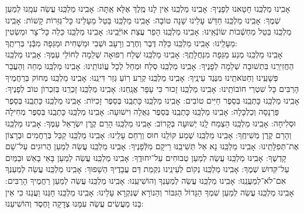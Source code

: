 \documentclass[twoside, openany, parskip=half, 11pt]{book}
\begin{document}
{ אָבִֽינוּ מַלְכֵּֽנוּ  חָטָאנוּ לְפָנֶיךָ:\hfill \break
אָבִֽינוּ מַלְכֵּֽנוּ אֵין לָנוּ מֶֽלֶךְ אֶלָּא אַֽתָּה: \hfill \break
 אָבִֽינוּ מַלְכֵּֽנוּ עֲשֵׂה עִמָֽנוּ לְמַעַן שְׁמֶךָ:\hfill \break
 אָבִֽינוּ מַלְכֵּֽנוּ חַדֵּשׁ עָלֵינוּ שָׁנָה טוֹבָה:\hfill \break
 אָבִֽינוּ מַלְכֵּֽנוּ בַּטֵל מֵעָלֵינוּ כָּל־גְּזֵּרוֹת קָשׁוֹת:\hfill \break
 אָבִֽינוּ מַלְכֵּֽנוּ בַּטֵל מַחְשְֿׁבוֹת שׂוֹנְֿאֵֽינוּ:\hfill \break
 אָבִֽינוּ מַלְכֵּֽנוּ הָפֵר עֲצַת אוֹיְּֿבֵֽינוּ:\hfill \break
 אָבִֽינוּ מַלְכֵּֽנוּ כַּלֵה כָּל־צָר וּמַשְׂטִין מֵעָלֵֽינוּ:\hfill \break
 אָבִֽינוּ מַלְכֵּֽנוּ כַּלֵּה דֶּבֶר וְחֶרֶב וְרָעָב וּשְׁבִי וּמַשְׁחִית וּמַגֵּפָה  מִבְּֿנֵי בְּרִיתֶֽךָ:\\
 אָבִֽינוּ מַלְכֵּֽנוּ מְנַע מַגֵּפָה מִנַּחֲלָתֶֽךָ:\hfill \break
 אָבִֽינוּ מַלְכֵּֽנוּ שְׁלַח רְפוּאָה שְׁלֵמָה לְחוֹלֵי עַמֶּךָ:\hfill \break
 אָבִֽינוּ מַלְכֵּֽנוּ הַחֲזִירֵֽנוּ בִּתְשׁוּבָה שְׁלֵמָה לְפָנֶיךָ:\hfill \break
 אָבִֽינוּ מַלְכֵּֽנוּ סְלַח וּמְחַל לְכָל עֲוֹנוֹתֵֽינוּ:\hfill \break
 אָבִֽינוּ מַלְכֵּֽנוּ מְחֵה וְהַעֲבֵר פְּשָׁעֵֽינוּ וְחַטֹּאתֵֽינוּ מִנֶּגֶד עֵינֶֽיךָ:\hfill \break
 אָבִֽינוּ מַלְכֵּֽנוּ קְרַע רֽוֹעַ גְּזַר דִּינֵֽנוּ:\hfill \break
 אָבִֽינוּ מַלְכֵּֽנוּ מְחוֹק בְּרַחֲמֶיךָ הָרַבִּים כָּל שִׁטְרֵי חוֹבוֹתֵֽינוּ:\hfill \break
 אָבִֽינוּ מַלְכֵּֽנוּ זָכוּר כִּי עָפָר אֲנָֽחְנוּ:\hfill \break
 אָבִֽינוּ מַלְכֵּֽנוּ זָכְרֵֽנוּ בְּזִכְרוׂן טוֹב לְפָנֶיךָ:\hfill \break
 אָבִֽינוּ מַלְכֵּֽנוּ כָּתְבֵֽנוּ בְּסֵפֶר חַיִּים טוֹבִים:\hfill \break
 אָבִֽינוּ מַלְכֵּֽנוּ כָּתְבֵֽנוּ בְּסֵפֶר זָכִיּוֹת:\hfill \break
 אָבִֽינוּ מַלְכֵּֽנוּ כָּתְבֵֽנוּ בְּסֵפֶר פַּרְנָסָה וְכַלְכָּלָה:\hfill \break
 אָבִֽינוּ מַלְכֵּֽנוּ כָּתְבֵֽנוּ בְּסֵפֶר גְּאֻלָה וִישׁוּעָה:\hfill \break
 אָבִֽינוּ מַלְכֵּֽנוּ כָּתְבֵֽנוּ בְּסֵפֶר מְחִילָה וּסְלִיחָה: \hfill \break
 אָבִֽינוּ מַלְכֵּֽנוּ הַצְמַח לָֽנוּ יְשׁוּעָה בְּקָרוֹב:\hfill \break
 אָבִֽינוּ מַלְכֵּֽנוּ הָרֵם קֶֽרֶן יִשְׂרָאֵל עַמֶּךָ:\hfill \break
 אָבִֽינוּ מַלְכֵּֽנוּ וְהָרֵם קֶרֶן מְשִׁיחֶֽךָ:\hfill \break
 אָבִֽינוּ מַלְכֵּֽנוּ שְׁמַע קּוֹלֵֽנוּ חוּס וְרַחֵם עָלֵֽינוּ:\hfill \break
 אָבִֽינוּ מַלְכֵּֽנוּ קַבֵּל בְּרַחֲמִים וּבְרָצוֹן אֶת־תְּפִלָּתֵֽינוּ:\hfill \break
 אָבִֽינוּ מַלְכֵּֽנוּ נָא אַל תְּשִׁיבֵֽנּוּ רֵיקָם מִלְּֿפָנֶיךָ:\hfill \break
 אָבִֽינוּ מַלְכֵּֽנוּ עֲשֵׂה לְמַעַן הֲרוּגִים עַל־שֵׁם קָדְשֶׁךָ:\hfill \break
 אָבִֽינוּ מַלְכֵּֽנוּ עֲשֵׂה לְמַעַן טְבוּחִים עַל־יִחוּדֶֽךָ:\hfill \break
 אָבִֽינוּ מַלְכֵּֽנוּ עֲשֵׂה לְמַעַן בָּאֵי בָאֵשׁ וּבַמַּיִם עַל־קִּדוּשׁ שְׁמֶךָ:\hfill \break
 אָבִֽינוּ מַלְכֵּֽנוּ נְקוֹם לְעֵינֵֽינוּ נִקְמַת דַּם עֲבָדֶיךָ הַשָׁפוּךְ:\hfill \break
 אָבִֽינוּ מַלְכֵּֽנוּ עֲשֵׂה לְמַעַנְךָ אִם־לֹא־לְמַעֲנֵֽנוּ:\hfill \break
 אָבִֽינוּ מַלְכֵּֽנוּ עֲשֵׂה לְמַעַנְךָ וְהוֹשִׁיעֵֽנוּ:\hfill \break
 אָבִֽינוּ מַלְכֵּֽנוּ עֲשֵׂה לְמַעַן רַחֲמֶיךָ הָרַבִּים:\hfill \break
 אָבִֽינוּ מַלְכֵּֽנוּ עֲשֵׂה לְמַעַן שִׁמְךָ הַגָּדוֹל הַגִּבּוֹר וְהַנוֹרָא שֶׁנִקְרָא עָלֵינוּ:\hfill \break
אָבִֽינוּ מַלְכֵּֽנוּ חָנֵּנוּ וַעֲנֵנוּ כִּי אֵין בָּנוּ מַעֲשִׂים עֲשֵׂה עִמָּנוּ צְדָקָה וָחֶסֶד וְהוֹשִׁיעֵנוּ:

}
\end{document}
